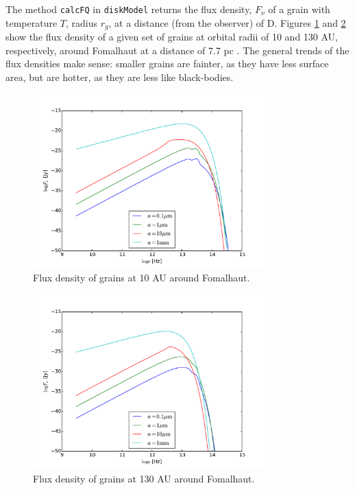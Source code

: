 \documentclass[12pt,preprint]{aastex}
\begin{document}
The method \texttt{calcFQ} in \texttt{diskModel} returns the flux density, $F_\nu$ of a grain with temperature $T$, radius $r_g$, at a distance (from the observer) of D. Figures \ref{fig:Fnu10AU} and \ref{fig:Fnu130AU} show the flux density of a given set of grains at orbital radii of 10 and 130 AU, respectively, around Fomalhaut at a distance of 7.7 pc \cite{Fom}. The general trends of the flux densities make sense: smaller grains are fainter, as they have less surface area, but are hotter, as they are less like black-bodies. 


\begin{figure}[htbp]
\begin{center}
\includegraphics[width=0.8\textwidth]{Fnu10AU.pdf}
    \caption{Flux density of grains at 10 AU around Fomalhaut.}
    \label{fig:Fnu10AU}
\end{center}
\end{figure}

\begin{figure}[htbp]
\begin{center}
\includegraphics[width=0.8\textwidth]{Fnu130AU.pdf}
    \caption{Flux density of grains at 130 AU around Fomalhaut.}
    \label{fig:Fnu130AU}
\end{center}
\end{figure}
\end{document}
